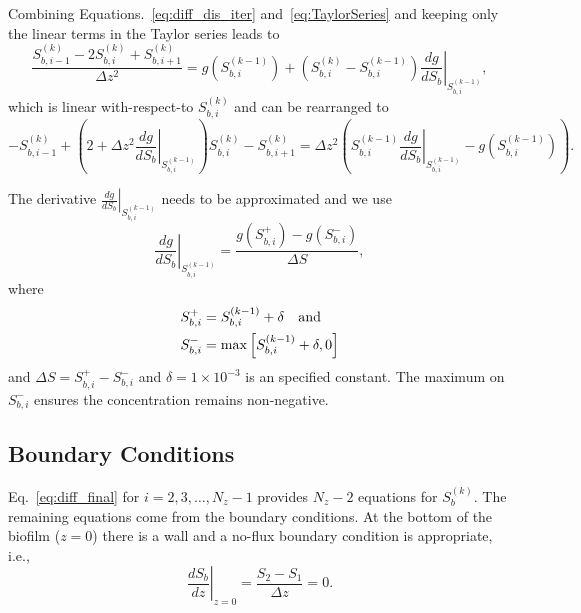 \documentclass[letterpaper, twoside]{article}
\numberwithin{equation}{section}
\newcommand{\ie}{i.e.}
\begin{document}
Combining Equations.~\ref{eq:diff_dis_iter} and~\ref{eq:TaylorSeries} and keeping only the linear terms in the Taylor series leads to
\begin{equation} \label{eq:diff_linear}
  \frac{ S_{b,i-1}^{(k)} - 2 S_{b,i}^{(k)} + S_{b,i+1}^{(k)}}{\Delta z^2} =  g\left(S_{b,i}^{(k-1)}\right) + \left( S_{b,i}^{(k)} - S_{b,i}^{(k-1)}\right) \left.\frac{d g}{d S_b}\right|_{S_{b,i}^{(k-1)}},
\end{equation}
which is linear with-respect-to $S_{b,i}^{(k)}$ and can be rearranged to
\begin{equation}
  \label{eq:diff_final}
  -S_{b,i-1}^{(k)} + \left( 2 +\Delta z^2\left.\frac{d g}{d S_b}\right|_{S_{b,i}^{(k-1)}}\right) S_{b,i}^{(k)} - S_{b,i+1}^{(k)}
  = \Delta z^2\left( S_{b,i}^{(k-1)} \left.\frac{d g}{d S_b}\right|_{S_{b,i}^{(k-1)}} - g\left(S_{b,i}^{(k-1)}\right)\right) .
\end{equation}

The derivative $\left.\frac{d g}{d S_b}\right|_{S_{b,i}^{(k-1)}}$ needs to be approximated and we use
\begin{equation}
  \label{eq:dgds}
  \left.\frac{d g}{d S_b}\right|_{S_{b,i}^{(k-1)}} = \frac{g\left(S_{b,i}^+\right) - g\left(S_{b,i}^{-}\right)}{\Delta S},
\end{equation}
where
\begin{align*}
  S_{b,i}^+&=S_{b,i}^{(k-1)}+\delta \text{\quad and} \\
  S_{b,i}^-&=\max\left[S_{b,i}^{(k-1)}+\delta,0\right]
\end{align*}
and $\Delta S = S_{b,i}^+ - S_{b,i}^-$ and $\delta=1\times 10^{-3}$ is an specified constant.  The maximum on $S_{b,i}^-$ ensures the concentration remains non-negative.

\subsection{Boundary Conditions} \label{Boundary Conditions}
Eq.~\ref{eq:diff_final} for $i=2,3,\dots,N_z-1$ provides $N_z-2$ equations for $S_{b}^{(k)}$.  The remaining equations come from the boundary conditions.  At the bottom of the biofilm ($z=0$) there is a wall and a no-flux boundary condition is appropriate, \ie,
\begin{equation}
  \label{eq:BC1}
  \left.\frac{d S_b}{dz}\right|_{z=0}= \frac{S_2 - S_1}{\Delta z} =0.
\end{equation}
\end{document}
